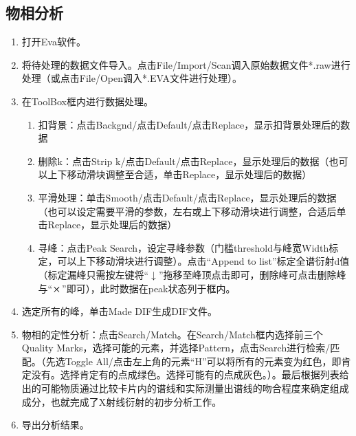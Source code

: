 \documentclass[a4paper]{article}
\begin{document}
\subsection{物相分析}

\begin{enumerate}
	\item 打开Eva软件。
	\item 将待处理的数据文件导入。点击File/Import/Scan调入原始数据文件*.raw进行处理（或点击File/Open调入*.EVA文件进行处理）。
	\item 在ToolBox框内进行数据处理。
	\begin{enumerate}
		\item 扣背景：点击Backgnd/点击Default/点击Replace，显示扣背景处理后的数据
		\item 删除k：点击Strip k/点击Default/点击Replace，显示处理后的数据（也可以上下移动滑块调整至合适，单击Replace，显示处理后的数据）
		\item 平滑处理：单击Smooth/点击Default/点击Replace，显示处理后的数据（也可以设定需要平滑的参数，左右或上下移动滑块进行调整，合适后单击Replace，显示处理后的数据）
		\item 寻峰：点击Peak Search，设定寻峰参数（门槛threshold与峰宽Width标定，可以上下移动滑块进行调整）。点击“Append to list”标定全谱衍射d值（标定漏峰只需按左键将“$ \downarrow $”拖移至峰顶点击即可，删除峰可点击删除峰与“$ \cross $”即可），此时数据在peak状态列于框内。
	\end{enumerate}
    \item 选定所有的峰，单击Made DIF生成DIF文件。
    \item 物相的定性分析：点击Search/Match。在Search/Match框内选择前三个Quality Marks，选择可能的元素，并选择Pattern，点击Search进行检索/匹配。（先选Toggle All/点击左上角的元素“H”可以将所有的元素变为红色，即肯定没有。选择肯定有的点成绿色。选择可能有的点成灰色。）。最后根据列表给出的可能物质通过比较卡片内的谱线和实际测量出谱线的吻合程度来确定组成成分，也就完成了X射线衍射的初步分析工作。
    \item 导出分析结果。
\end{enumerate}
\end{document}
